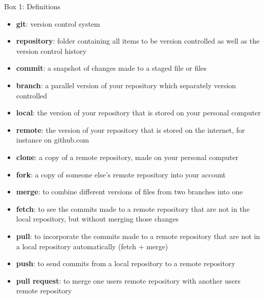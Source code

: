 Box 1: Definitions

\begin{itemize}
\item \textbf{git}: version control system 
\item \textbf{repository}: folder containing all items to be version controlled as well as the version control history
\item \textbf{commit}: a snapshot of changes made to a staged file or files 
\item \textbf{branch}: a parallel version of your repository which separately version controlled
\item \textbf{local}: the version of your repository that is stored on your personal computer
\item \textbf{remote}: the version of your repository that is stored on the internet, for instance on github.com
\item \textbf{clone}: a copy of a remote repository, made on your personal computer
\item \textbf{fork}: a copy of someone else's remote repository into your account
\item \textbf{merge}: to combine different versions of files from two branches into one
\item \textbf{fetch}: to see the commits made to a remote repository that are not in the local repository, but without merging those changes
\item \textbf{pull}: to incorporate the commits made to a remote repository that are not in a local repository automatically (fetch + merge)
\item \textbf{push}: to send commits from a local repository to a remote repository
\item \textbf{pull request}: to merge one users remote repository with another users remote repository

\end{itemize}